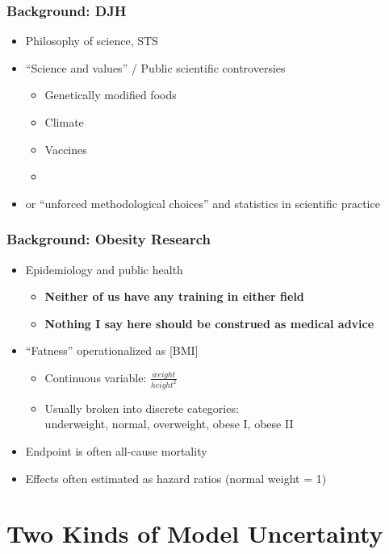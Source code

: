 \documentclass{philslides}
\begin{document}
\frame
{
	\frametitle{Background:  DJH}
	\begin{itemize}
	\item Philosophy of science, STS
	\item ``Science and values'' / Public scientific controversies
		\begin{itemize}
		\item Genetically modified foods \autocite{Hicks2015, Hicks2016a, Hicks2017b}
		\item Climate \autocite{Hicks2017a}
		\item Vaccines \autocite{Hicks2017a}
		\item {}
		 \end{itemize}
	\item {} or ``unforced methodological choices'' \autocite{Winsberg2012} and statistics in scientific practice
	\end{itemize}
}
\frame
{
	\frametitle{Background: Obesity Research}
	\begin{itemize}
	\item Epidemiology and public health
		\begin{itemize}
		\item \textbf{Neither of us have any training in either field}
		\item \textbf{Nothing I say here should be construed as medical advice}
		\end{itemize}
	\item ``Fatness'' operationalized as  [BMI]
		\begin{itemize}
		\item Continuous variable:  $\displaystyle \frac{weight}{height^2}$
		\item Usually broken into discrete categories:\\
			underweight, normal, overweight, obese I, obese II
		\end{itemize}
	\item Endpoint is often all-cause mortality
	\item Effects often estimated as hazard ratios (normal weight = 1)
	\end{itemize}
}



\section{Two Kinds of Model Uncertainty}
\subsection*{}
\end{document}
